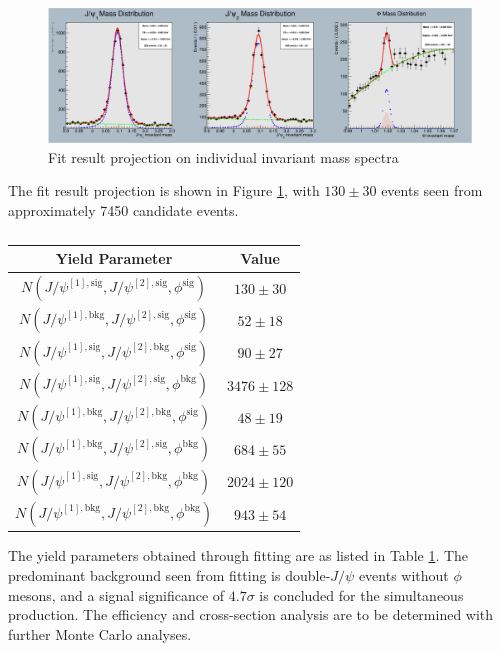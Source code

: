 \documentclass[10pt,twocolumn]{article}
\begin{document}
\begin{figure}[!htbp]
    \centering
    \includegraphics[width=1.0\linewidth]{images/JpsiJpsiPhi_fit.png}
    \caption{Fit result projection on individual invariant mass spectra}
    \label{fig:JpsiJpsiPhi_fit}
\end{figure}

The fit result projection is shown in Figure  \ref{fig:JpsiJpsiPhi_fit}, with $130 \pm 30$ events seen from approximately 7450 candidate events.

\begin{table}[h!]
    \centering
    \caption{}
    \begin{tabular}{cc}
        \toprule
        \textbf{Yield Parameter} & \textbf{Value} \\
        \midrule
        $N(J/\psi^{[1], \text{sig} },J/\psi^{[2],\text{sig} }, \phi^\text{sig})$ & $130 \pm 30$ \\
        $N(J/\psi^{[1], \text{bkg} },J/\psi^{[2],\text{sig} }, \phi^\text{sig})$ & $52 \pm 18$ \\
        $N(J/\psi^{[1], \text{sig} },J/\psi^{[2],\text{bkg} }, \phi^\text{sig})$ & $90 \pm 27$ \\
        $N(J/\psi^{[1], \text{sig} },J/\psi^{[2],\text{sig} }, \phi^\text{bkg})$ & $3476 \pm 128$ \\
        $N(J/\psi^{[1], \text{bkg} },J/\psi^{[2],\text{bkg} }, \phi^\text{sig})$ & $48 \pm 19$ \\
        $N(J/\psi^{[1], \text{bkg} },J/\psi^{[2],\text{sig} }, \phi^\text{bkg})$ & $684 \pm 55$ \\
        $N(J/\psi^{[1], \text{sig} },J/\psi^{[2],\text{bkg} }, \phi^\text{bkg})$ & $2024 \pm 120$ \\
        $N(J/\psi^{[1], \text{bkg} },J/\psi^{[2],\text{bkg} }, \phi^\text{bkg})$ & $943 \pm 54$ \\
        \bottomrule
    \end{tabular}
    \label{tab:fitres_JpsiJpsiPhi}
\end{table}

The yield parameters obtained through fitting are as listed in Table \ref{tab:fitres_JpsiJpsiPhi}. The predominant background seen from fitting is double-$J/\psi$ events without $\phi$ mesons, and a signal significance of $4.7 \sigma$ is concluded for the simultaneous production. The efficiency and cross-section analysis are to be determined with further Monte Carlo analyses.
\end{document}
